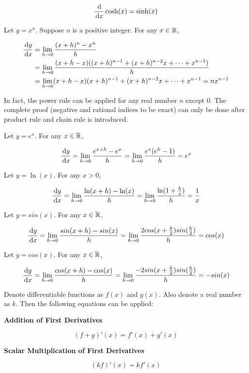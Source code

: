 \documentclass[a4paper,12pt]{article}
\begin{document}
\begin{pst}
\begin{alist}
    $$\frac{\,\mathrm{d}}{\,\mathrm{d} x}\cosh(x)=\sinh(x)$$
  \end{alist}

  \prf{} Let $y=x^{n}$. Suppose $n$ is a positive integer. For any $x\in \mathbb{R}$,

  $$\begin{aligned}[t]
    \frac{\,\mathrm{d} y}{\,\mathrm{d} x}&=\lim_{h\to 0}\frac{(x+h)^{n}-x^{n}}{h}\\
    &=\lim_{h\to 0}\frac{(x+h-x)((x+h)^{n-1}+(x+h)^{n-2}x+\cdots+x^{n-1})}{h}\\
    &=\lim_{h\to 0}(x+h-x)(x+h)^{n-1}+(x+h)^{n-2}x+\cdots+x^{n-1}=nx^{n-1}
  \end{aligned}$$\s

  In fact, the power rule can be applied for any real number $n$ except $0$. The complete proof (negative and rational indices to be exact) can only be done after product rule and chain rule is introduced.\n

   Let $y=e^{x}$. For any $x \in \mathbb{R}$,

  $$\frac{\,\mathrm{d} y}{\,\mathrm{d} x}=\lim_{h\to 0}\frac{e^{x+h}-e^{x}}{h}=\lim_{h\to 0}\frac{e^{x}(e^{h}-1)}{h}=e^{x}$$\s

   Let $y=\ln(x)$. For any $x>0$,

  $$\frac{\,\mathrm{d} y}{\,\mathrm{d} x}=\lim_{h\to 0}\frac{\ln(x+h)-\ln(x)}{h}=\lim_{h\to 0}\frac{\ln(1+\frac{h}{x})}{h}=\frac{1}{x}$$\s

   Let $y=sin(x)$. For any $x\in \mathbb{R}$,

  $$\frac{\,\mathrm{d} y}{\,\mathrm{d} x}=\lim_{h\to 0}\frac{sin(x+h)-sin(x)}{h}=\lim_{h\to 0}\frac{2cos(x+\frac{h}{2})sin(\frac{h}{2})}{h}=cos(x)$$\s

   Let $y=cos(x)$. For any $x\in \mathbb{R}$,

  $$\frac{\,\mathrm{d} y}{\,\mathrm{d} x}=\lim_{h\to 0}\frac{cos(x+h)-cos(x)}{h}=\lim_{h\to 0}\frac{-2sin(x+\frac{h}{2})sin(\frac{h}{2})}{h}=-sin(x)$$
\end{pst}\n

\begin{pst}
  Denote differentiable functions as $f(x)$ and $g(x)$. Also denote a real number as $k$. Then the following equations can be applied:

  \begin{alist}
    \item \textbf{Addition of First Derivatives}

    $$(f+g)'(x)=f'(x)+g'(x)$$

    \item \textbf{Scalar Multiplication of First Derivatives}

    $$(kf)'(x)=kf'(x)$$
  \end{alist}
\end{pst}
\end{document}
